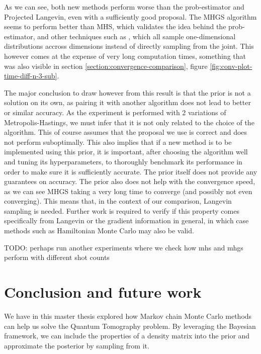 \documentclass[12pt]{memoir}
\begin{document}
As we can see, both new methods perform worse than the prob-estimator and Projected Langevin, even with a sufficiently good proposal. The MHGS algorithm seems to perform better than MHS, which validates the idea behind the prob-estimator, and other techniques such as \cite{Mai22, LLJL20}, which all sample one-dimensional distributions accross dimensions instead of directly sampling from the joint. This however comes at the expense of very long computation times, something that was also visible in section \ref{section:convergence-comparison}, figure \ref{fig:conv-plot-time-diff-n-3-sub}.\medbreak

The major conclusion to draw however from this result is that the prior is not a solution on its own, as pairing it with another algorithm does not lead to better or similar accuracy. As the experiment is performed with 2 variations of Metropolis-Hastings, we must infer that it is not only related to the choice of the algorithm. This of course assumes that the proposal we use is correct and does not perform suboptimally. This also implies that if a new method is to be implemented using this prior, it is important, after choosing the algorithm well and tuning its hyperparameters, to thoroughly benchmark its performance in order to make sure it is sufficiently accurate. The prior itself does not provide any guarantees on accuracy. The prior also does not help with the convergence speed, as we can see MHGS taking a very long time to converge (and possibly not even converging). This means that, in the context of our comparison, Langevin sampling is needed. Further work is required to verify if this property comes specifically from Langevin or the gradient information in general, in which case methods such as Hamiltonian Monte Carlo may also be valid.

TODO: perhaps run another experiments where we check how mhs and mhgs perform with different shot counts 
\chapter{Conclusion and future work}
We have in this master thesis explored how Markov chain Monte Carlo methods can help us solve the Quantum Tomography problem. By leveraging the Bayesian framework, we can include the properties of a density matrix into the prior and approximate the posterior by sampling from it.\medbreak
\end{document}
